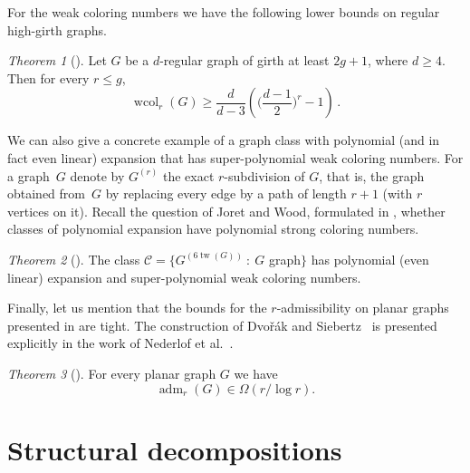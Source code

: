\documentclass[1p,number,a4paper]{elsarticle}
\theoremstyle{remark}
\newcommand{\CCC}{\mathscr{C}}
\DeclareMathOperator{\wcol}{wcol}
\DeclareMathOperator{\adm}{adm}
\DeclareMathOperator{\tw}{tw}
\newtheorem{theorem}{Theorem}[section]
\begin{document}
For the weak coloring numbers we have the following lower bounds on regular high-girth graphs. 

\begin{theorem}[\cite{grohe2015colouring}]\label{wcoldreg}
  Let $G$ be a $d$-regular graph of girth at least $2g+1$, where
  $d\geq 4$. Then for every $r\leq g$, 
  $$\wcol_r(G)\geq \frac{d}{d-3}\left(\Big(\frac{d-1}{2}\Big)^r-1\right)\,.$$
\end{theorem}

We can also give a concrete example of a graph class with polynomial (and in fact even linear) expansion that has super-polynomial weak coloring numbers. For a graph~$G$ denote by $G^{(r)}$ the exact $r$-subdivision
of $G$, that is, the graph obtained from~$G$ by replacing every edge by a path of length
$r+1$ (with $r$ vertices on it). 
Recall the question of Joret and Wood, formulated in , whether classes of polynomial expansion have polynomial strong coloring numbers. 

\begin{theorem}[\cite{grohe2015colouring}]\label{PolyExpWeak}
  The class $\CCC=\{G^{(6\tw(G))}~:~G$ graph$\}$ has polynomial (even linear) expansion and super-polynomial weak coloring numbers.  
\end{theorem}

Finally, let us mention that the bounds for the $r$-admissibility on planar graphs presented in  are tight. 
The construction of Dvo\v{r}\'ak and Siebertz~\cite{zdenek-seb} is presented explicitly in the work of Nederlof et al.~\cite{NederlofPW23}. 

\begin{theorem}[\cite{zdenek-seb}]
  For every planar graph $G$ we have 
  \[\adm_r(G)\in \Omega(r/\log r).\]
\end{theorem}

\section{Structural decompositions}\label{sec:ltc}
\end{document}
